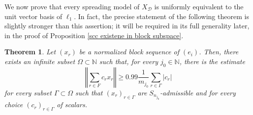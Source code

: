 \documentclass[12pt,a4paper]{amsart}
\newcommand{\N}{\mathbb{N}}
\newcommand{\bes}{\begin{equation*}}
\newcommand{\ees}{\end{equation*}}
\theoremstyle{definition}
\theoremstyle{plain}
\newtheorem{theorem}[question]{Theorem}
\begin{document}
We now prove that every spreading model of $X_\mathcal{D}$ is uniformly equivalent to the unit vector basis of $\ell_{1}$. In fact, the precise statement of the following theorem is slightly stronger than this assertion; it will be required in its full generality later, in the proof of Proposition \ref{scc existene in block subspace}.



\begin{theorem}{\label{l1_spreading_model}}
Let $(x_{r})$ be a normalized block  sequence  of $(e_{i})$. Then, there exists an infinite subset $\Omega\subset\N$ such that, for every $j_{0}\in\N$, there is the estimate
\bes \left\Vert \sum_{r\in F}c_{r}x_{r}\right\Vert \geq 0.99\frac{1}{m_{j_{0}}}\sum_{r\in \Gamma}|c_{r}| \ees
for every subset $\Gamma\subset\Omega$ such that $(x_{r})_{r\in \Gamma}$ are $S_{n_{j_{0}}}$-admissible and for every choice $(c_{r})_{r\in \Gamma}$ of scalars.
\end{theorem}
\end{document}
